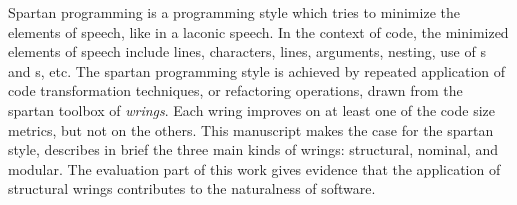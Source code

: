 
Spartan programming is a programming style 
which tries to minimize the elements of speech, like in a laconic speech.
In the context of code, the minimized elements of speech include 
lines, characters, lines, arguments, nesting, use of s and
s, etc.  
The spartan programming style is achieved by repeated application
of code transformation techniques, or refactoring operations, drawn 
from the spartan toolbox of \emph{wrings}. 
Each wring improves on at least one of the code size metrics, but
not on the others.
This manuscript makes the case for the spartan style, describes in brief 
the three main kinds of wrings: structural, nominal, and modular. 
The evaluation part of this work gives evidence that the application of
structural wrings contributes to the naturalness of software. 


